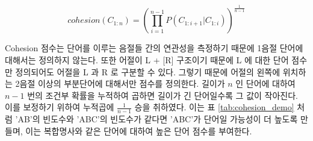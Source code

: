 \documentclass[oneside, ko,phd]{snuthesis_utf8_kor}
\begin{document}
\begin{equation}
\label{eq:cohesion}
cohesion(C_{1:n}) = \left( \prod_{i=1}^{n-1} P(C_{1:i+1} \vert C_{1:i}) \right) ^ {\frac{1}{n-1}} 
\end{equation}

Cohesion 점수는 단어를 이루는 음절들 간의 연관성을 측정하기 때문에 1음절 단어에 대해서는 정의하지 않는다.
또한 어절이 L + [R] 구조이기 때문에 L 에 대한 단어 점수만 정의되어도 어절을 L 과 R 로 구분할 수 있다.
그렇기 때문에 어절의 왼쪽에 위치하는 2음절 이상의 부분단어에 대해서만 점수를 정의한다.
길이가 $n$ 인 단어에 대하여 $n-1$ 번의 조건부 확률을 누적하여 곱하면 길이가 긴 단어일수록 그 값이 작아진다.
이를 보정하기 위하여 누적곱에 $\frac{1}{n-1}$ 승을 취하였다.
이는 표 \ref{tab:cohesion_demo} 처럼 'AB'의 빈도수와 'ABC'의 빈도수가 같다면 'ABC'가 단어일 가능성이 더 높도록 만들며, 이는 복합명사와 같은 단어에 대하여 높은 단어 점수를 부여한다.

\begin{table}[ht]
\centering
\caption{Cohesion 점수와 Branching Entropy 예시}
\label{tab:cohesion_demo}
\end{table}
\end{document}
